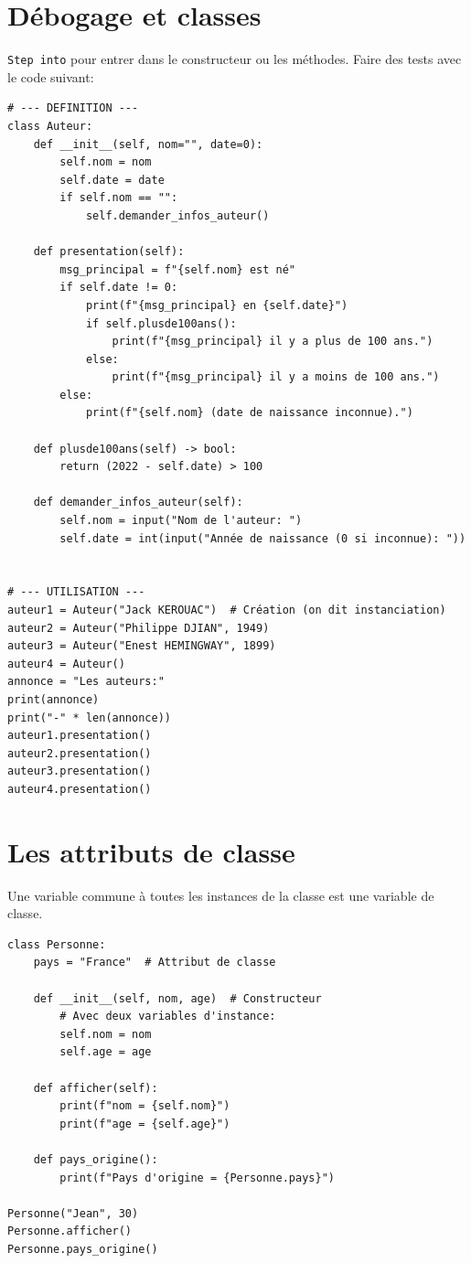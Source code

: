 \documentclass[a4paper,11pt]{book}
\begin{document}
\section{Débogage et classes}
\texttt{Step into} pour entrer dans le constructeur ou les méthodes. Faire des tests avec le code suivant:
\begin{lstlisting}[caption=Pour tester le débogage]
# --- DEFINITION ---
class Auteur:
    def __init__(self, nom="", date=0):
        self.nom = nom
        self.date = date
        if self.nom == "":
            self.demander_infos_auteur()

    def presentation(self):
        msg_principal = f"{self.nom} est né"
        if self.date != 0:
            print(f"{msg_principal} en {self.date}")
            if self.plusde100ans():
                print(f"{msg_principal} il y a plus de 100 ans.")
            else:
                print(f"{msg_principal} il y a moins de 100 ans.")
        else:
            print(f"{self.nom} (date de naissance inconnue).")

    def plusde100ans(self) -> bool:
        return (2022 - self.date) > 100

    def demander_infos_auteur(self):
        self.nom = input("Nom de l'auteur: ")
        self.date = int(input("Année de naissance (0 si inconnue): "))


# --- UTILISATION ---
auteur1 = Auteur("Jack KEROUAC")  # Création (on dit instanciation)
auteur2 = Auteur("Philippe DJIAN", 1949)
auteur3 = Auteur("Enest HEMINGWAY", 1899)
auteur4 = Auteur()
annonce = "Les auteurs:"
print(annonce)
print("-" * len(annonce))
auteur1.presentation()
auteur2.presentation()
auteur3.presentation()
auteur4.presentation()
\end{lstlisting}
\medskip

\section{Les attributs de classe}\label{AttributDeClasse}
Une variable commune à toutes les instances de la classe est une variable de classe.
\begin{lstlisting}[caption=Attribut de classe]
class Personne:
    pays = "France"  # Attribut de classe

    def __init__(self, nom, age)  # Constructeur
    	# Avec deux variables d'instance:
        self.nom = nom
        self.age = age  

    def afficher(self):
        print(f"nom = {self.nom}")
        print(f"age = {self.age}")

    def pays_origine():
        print(f"Pays d'origine = {Personne.pays}")

Personne("Jean", 30)
Personne.afficher()
Personne.pays_origine()
\end{lstlisting}
\medskip
\end{document}
